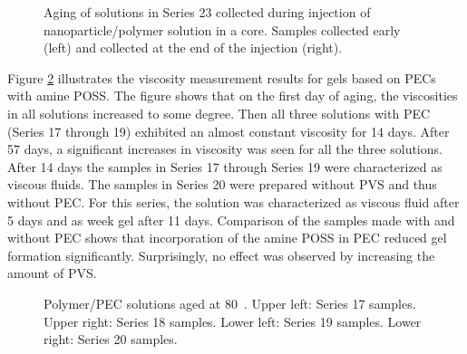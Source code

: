 \documentclass[journal = enfuem, manuscript =  article]{achemso}
\begin{document}
\begin{figure} 
    \centering
    \caption{Aging of solutions in Series 23 collected during injection of nanoparticle/polymer solution in a core. Samples collected early (left) and collected at the end of the injection (right).}
    \label{cht:s23visc80}
\end{figure} 

Figure \ref{cht:s17visc80} illustrates the viscosity measurement results for gels based on PECs with amine POSS. The figure shows that on the first day of aging, the viscosities in all solutions increased to some degree. Then all three solutions with PEC (Series 17 through 19) exhibited an almost constant viscosity for 14 days. After 57 days, a significant increases in viscosity was seen for all the three solutions. After 14 days the samples in Series 17 through Series 19 were characterized as viscous fluids. The samples in Series 20 were prepared without PVS and thus without PEC. For this series, the solution was characterized as viscous fluid after 5 days and as week gel after 11 days. Comparison of the samples made with and without PEC shows that incorporation of the amine POSS in PEC reduced gel formation significantly. Surprisingly, no effect was observed by increasing the amount of PVS.

\begin{figure}
    \centering
    \caption{Polymer/PEC solutions aged at 80~\celsius. Upper left: Series 17 samples. Upper right: Series 18 samples. Lower left: Series 19 samples. Lower right: Series 20 samples.}
    \label{cht:s17visc80}
\end{figure}
\end{document}
